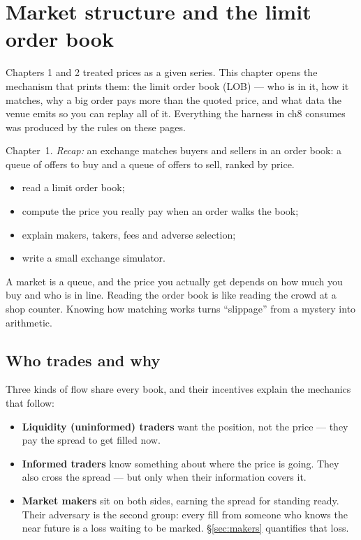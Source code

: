 \chapter{Market structure and the limit order book}\label{ch:lob}
Chapters 1 and 2 treated prices as a given series. This chapter opens
the mechanism that prints them: the limit order book (LOB) --- who is
in it, how it matches, why a big order pays more than the quoted
price, and what data the venue emits so you can replay all of it.
Everything the harness in ch8 consumes was produced by the rules on
these pages.

\begin{rulebox}
Chapter~1. \emph{Recap:} an exchange matches buyers and sellers in an order book: a queue of offers to buy and a queue of offers to sell, ranked by price.
\end{rulebox}
\begin{wins}
\begin{itemize}
\item read a limit order book;
\item compute the price you really pay when an order walks the book;
\item explain makers, takers, fees and adverse selection;
\item write a small exchange simulator.
\end{itemize}
\end{wins}
\begin{principle}
A market is a queue, and the price you actually get depends on how much you buy and who is in line. Reading the order book is like reading the crowd at a shop counter. Knowing how matching works turns ``slippage'' from a mystery into arithmetic.
\end{principle}

\section{Who trades and why}\label{sec:whotrades}
Three kinds of flow share every book, and their incentives explain
the mechanics that follow:

\begin{itemize}
\item \textbf{Liquidity (uninformed) traders} want the position, not
the price --- they pay the spread to get filled now.
\item \textbf{Informed traders} know something about where the price
is going. They also cross the spread --- but only when their
information covers it.
\item \textbf{Market makers} sit on both sides, earning the spread
for standing ready. Their adversary is the second group: every fill
from someone who knows the near future is a loss waiting to be
marked. \S\ref{sec:makers} quantifies that loss.
\end{itemize}


